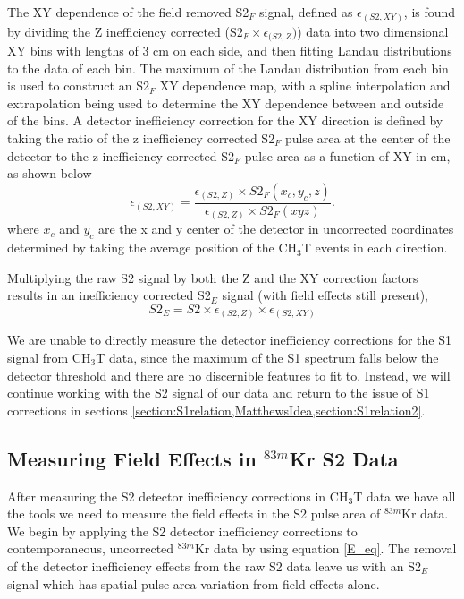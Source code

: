 \documentclass[a4paper,10pt,twocolumn]{article}
\begin{document}
The XY dependence of the field removed S2$_F$ signal, defined as $\epsilon_{(S2,XY)}$, is found by dividing the Z inefficiency corrected (S2$_F \times \epsilon_{(S2,Z})$) data into two dimensional XY bins with lengths of 3 cm on each side, and then fitting Landau distributions to the data of each bin.  The maximum of the Landau distribution from each bin is used to construct an S2$_F$ XY dependence map, with a spline interpolation and extrapolation being used to determine the XY dependence between and outside of the bins.  A detector inefficiency correction for the XY direction is defined by taking the ratio of the z inefficiency corrected S2$_F$ pulse area at the center of the detector to the z inefficiency corrected S2$_F$ pulse area as a function of XY in cm, as shown below
\begin{equation}
\epsilon_{(S2,XY)} = \frac{\epsilon_{(S2,Z)} \times S2_F(x_c,y_c,z)} { \epsilon_{(S2,Z)} \times S2_F(xyz)}.
\end{equation} 
where $x_c$ and $y_c$ are the x and y center of the detector in uncorrected coordinates determined by taking the average position of the CH$_3$T events in each direction.



Multiplying the raw S2 signal by both the Z and the XY correction factors results in an inefficiency corrected S2$_E$ signal (with field effects still present), 
\begin{equation}\label{E_eq}
S2_E =S2 \times \epsilon_{(S2,Z)} \times \epsilon_{(S2,XY)} 
\end{equation}

We are unable to directly measure the detector inefficiency corrections for the S1 signal from CH$_3$T data, since the maximum of the S1 spectrum falls below the detector threshold and there are no discernible features to fit to. Instead, we will continue working with the S2 signal of our data and return to the issue of S1 corrections in sections \cref{section:S1relation,MatthewsIdea,section:S1relation2}.


 
\subsection{Measuring Field Effects in $^{83m}$Kr S2 Data} \label{section:FieldEffects}

After measuring the S2 detector inefficiency corrections in CH$_3$T data we have all the tools we need to measure the field effects in the S2 pulse area of $^{83m}$Kr data.  We begin by applying the S2 detector inefficiency corrections to contemporaneous,  uncorrected $^{83m}$Kr data by using equation \ref{E_eq}.  The removal of the detector inefficiency effects from the raw S2 data leave us with an S2$_E$ signal which has spatial pulse area variation from field effects alone.
\end{document}
